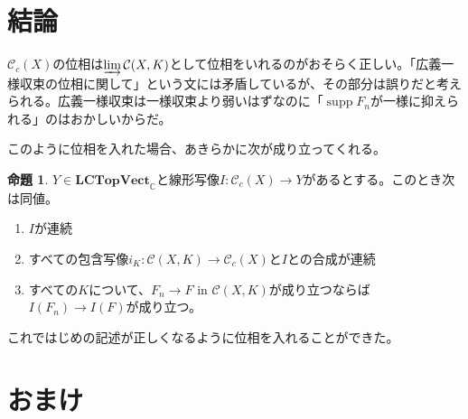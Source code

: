﻿\documentclass[12pt]{jsarticle}
\newcommand{\N}{\mathbb{N}}
\newcommand{\C}{\mathbb{C}}
\newcommand{\LCTopVect}{\textbf{LCTopVect}_{\C}}
\newcommand{\CCX}{\mathcal{C}_c(X)}%
\newcommand{\CXK}{\mathcal{C}(X,K)}%
\newcommand{\limCXK}{\varinjlim \CXK}%
\DeclareMathOperator{\supp}{supp}
\DeclareMathOperator{\Int}{Int}
\theoremstyle{definition}%
\newtheorem{proposition}[definition]{命題}
\begin{document}
\begin{comment}
\begin{proposition}
  $X$が局所コンパクトHausdorff空間であり、$X = \bigcup_{n \in \N} K_n$かつ$K_n \subset \Int K_{n+1}$が成り立つようなコンパクト部分集合の列$K_n$(取り尽くし列)があるとする。このとき次が成り立つ。
  \begin{enumerate}
    \item  関手$\mathcal{C}(X, K_n) \colon \N \to \LCTopVect$はstrict inductive limit systemであって、命題\ref{goal}の仮定を満たす。
    \item $\CCX$に$\varinjlim \mathcal{C}(X,K_n)$として位相を定義できる
    \item 上記の$\CCX$の位相は取り尽くし列に依らない。
  \end{enumerate}
\end{proposition}

\end{comment}

\newpage
\section{結論}
$\CCX$の位相は$\limCXK$として位相をいれるのがおそらく正しい。「広義一様収束の位相に関して」という文には矛盾しているが、その部分は誤りだと考えられる。広義一様収束は一様収束より弱いはずなのに「$\supp F_n$が一様に抑えられる」のはおかしいからだ。

このように位相を入れた場合、あきらかに次が成り立ってくれる。
\begin{proposition}
$Y \in \LCTopVect$と線形写像$I \colon \CCX \to Y$があるとする。このとき次は同値。
\begin{enumerate}
  \item $I$が連続
  \item すべての包含写像$i_K \colon \CXK \to \CCX$と$I$との合成が連続
  \item すべての$K$について、$F_n \to F$ in $\CXK$が成り立つならば$I(F_n) \to I(F)$が成り立つ。
\end{enumerate}
これではじめの記述が正しくなるように位相を入れることができた。
\end{proposition}

\newpage
\section{おまけ}
\end{document}
